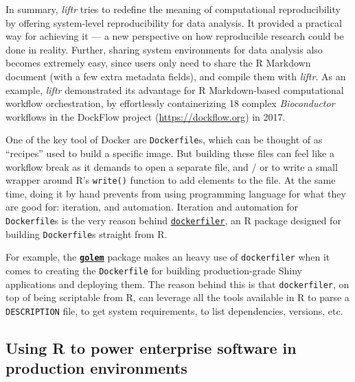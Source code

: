 In summary, \emph{liftr} tries to redefine the meaning of computational
reproducibility by offering system-level reproducibility for data
analysis. It provided a practical way for achieving it --- a new
perspective on how reproducible research could be done in reality.
Further, sharing system environments for data analysis also becomes
extremely easy, since users only need to share the R Markdown document
(with a few extra metadata fields), and compile them with \emph{liftr}.
As an example, \emph{liftr} demonstrated its advantage for R
Markdown-based computational workflow orchestration, by effortlessly
containerizing 18 complex \emph{Bioconductor} workflows in the DockFlow
project (\url{https://dockflow.org}) in 2017.

One of the key tool of Docker are \texttt{Dockerfile}s, which can be
thought of as ``recipes'' used to build a specific image. But building
these files can feel like a workflow break as it demands to open a
separate file, and / or to write a small wrapper around R's
\texttt{write()} function to add elements to the file. At the same time,
doing it by hand prevents from using programming language for what they
are good for: iteration, and automation. Iteration and automation for
\texttt{Dockerfile}s is the very reason behind
\href{https://github.com/ColinFay/dockerfiler}{\texttt{dockerfiler}}, an
R package designed for building \texttt{Dockerfile}s straight from R.

For example, the
\textbf{\href{https://github.com/ThinkR-open/golem}{\texttt{golem}}}
package makes an heavy use of \texttt{dockerfiler} when it comes to
creating the \texttt{Dockerfile} for building production-grade Shiny
applications and deploying them. The reason behind this is that
\texttt{dockerfiler}, on top of being scriptable from R, can leverage
all the tools available in R to parse a \texttt{DESCRIPTION} file, to
get system requirements, to list dependencies, versions, etc.

\hypertarget{using-r-to-power-enterprise-software-in-production-environments}{%
\subsection{Using R to power enterprise software in production
environments}\label{using-r-to-power-enterprise-software-in-production-environments}}

\label{enterprise}

